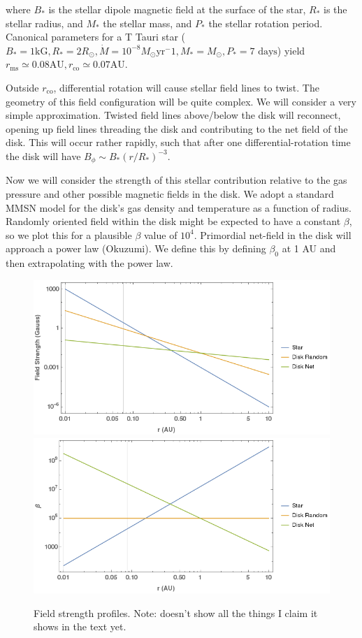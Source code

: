 \noindent where $B_*$ is the stellar dipole magnetic field at the surface of the star, $R_*$ is the stellar radius, and $M_*$ the stellar mass, and $P_*$ the stellar rotation period.  Canonical parameters for a T Tauri star ($B_*=1\text{kG}, R_*=2R_\odot, \dot{M}=10^{-8}M_\odot \text{yr}^-1, M_*=M_\odot, P_*=7 \text{ days}$) yield $r_\text{ms} \simeq 0.08 \text{AU}, r_\text{co} \simeq 0.07 \text{AU}$.

Outside $r_{\text{co}}$, differential rotation will cause stellar field lines to twist.  The geometry of this field configuration will be quite complex.  We will consider a very simple approximation.  Twisted field lines above/below the disk will reconnect, opening up field lines threading the disk and contributing to the net field of the disk.  This will occur rather rapidly, such that after one differential-rotation time the disk will have $B_\phi \sim B_* (r/R_*)^{-3}$. 

Now we will consider the strength of this stellar contribution relative to the gas pressure and other possible magnetic fields in the disk.  We adopt a standard MMSN model for the disk's gas density and temperature as a function of radius.  Randomly oriented field within the disk might be expected to have a constant $\beta$, so we plot this for a plausible $\beta$ value of $10^4$.  Primordial net-field in the disk will approach a power law (Okuzumi).  We define this by defining $\beta_0$ at 1 AU and then extrapolating with the power law.

\begin{figure}[h!]
\centering
\includegraphics[width=0.49\columnwidth]{figs/figsChapter3/FieldStrengthProfiles.png}
\includegraphics[width=0.49\columnwidth]{figs/figsChapter3/BetaProfiles.png}
\caption{Field strength profiles. Note: doesn't show all the things I claim it shows in the text yet.}
\label{fieldStrengthProfiles}
\end{figure}

